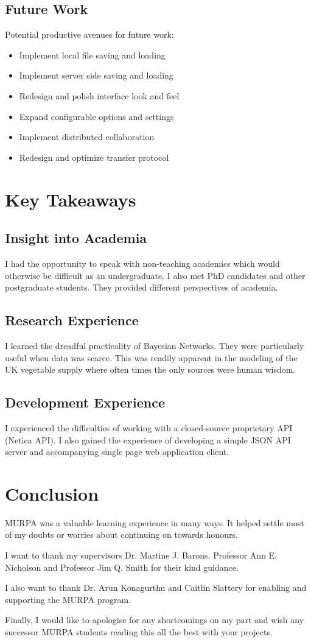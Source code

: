 \documentclass[12pt,notitlepage]{article}
\begin{document}
\begin{multicols}{2}
\subsection{Future Work}
Potential productive avenues for future work:
\begin{itemize}
\item Implement local file saving and loading
\item Implement server side saving and loading
\item Redesign and polish interface look and feel
\item Expand configurable options and settings
\item Implement distributed collaboration
\item Redesign and optimize transfer protocol
\end{itemize}
\section{Key Takeaways}\label{sec:takeaways}
\subsection{Insight into Academia}
I had the opportunity to speak with non-teaching academics which would otherwise be difficult as an undergraduate. I also met PhD candidates and other postgraduate students. They provided different perspectives of academia.
\subsection{Research Experience}
I learned the dreadful practicality of Bayesian Networks. They were particularly useful when data was scarce. This was readily apparent in the modeling of the UK vegetable supply where often times the only sources were human wisdom.
\subsection{Development Experience}
I experienced the difficulties of working with a closed-source proprietary API (Netica API). I also gained the experience of developing a simple JSON API server and accompanying single page web application client.
\section{Conclusion}\label{sec:conclusion}
MURPA was a valuable learning experience in many ways. It helped settle most of my doubts or worries about continuing on towards honours. 

I want to thank my supervisors Dr. Martine J. Barons, Professor Ann E. Nicholson and Professor Jim Q. Smith for their kind guidance. 

I also want to thank Dr. Arun Konagurthu and Caitlin Slattery for enabling and supporting the MURPA program.

Finally, I would like to apologise for any shortcomings on my part and wish any successor MURPA students reading this all the best with your projects.
\end{multicols}
\end{document}

